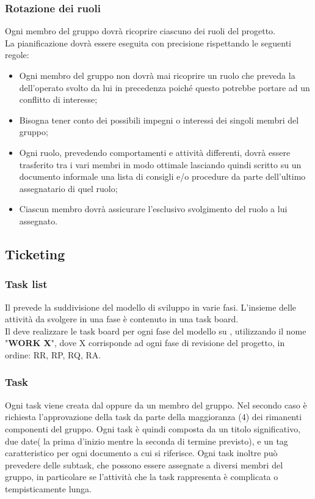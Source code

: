 \documentclass[NormeDiProgetto.tex]{subfiles}
\begin{document}
	\subsubsection{Rotazione dei ruoli}
	Ogni membro del gruppo dovrà ricoprire ciascuno dei ruoli del progetto.\\
	La pianificazione dovrà essere eseguita con precisione rispettando le seguenti regole:
	\begin{itemize}
		\item Ogni membro del gruppo non dovrà mai ricoprire un ruolo che preveda la  dell'operato svolto da lui in precedenza poiché questo potrebbe	portare ad un conflitto di interesse;
		\item Bisogna tener conto dei possibili impegni o interessi dei singoli membri del gruppo;
		\item Ogni ruolo, prevedendo comportamenti e attività differenti, dovrà essere trasferito tra i vari membri in modo ottimale lasciando quindi scritto su un documento informale una lista di consigli e/o procedure da parte dell'ultimo assegnatario di quel ruolo;
		\item Ciascun membro dovrà assicurare l'esclusivo svolgimento del ruolo a lui assegnato.
	\end{itemize}
	
	
	\subsection{Ticketing}
	\subsubsection{Task list}
	Il \pdp prevede la suddivisione del modello di sviluppo in varie fasi.
	L'insieme delle attività da svolgere in una fase è contenuto in una task board.\\
	Il \respdiprog deve realizzare le task board per ogni fase del modello su , utilizzando il nome "\textbf{WORK X}", dove X corrisponde ad ogni fase di revisione del progetto, in ordine: RR, RP, RQ, RA.
	
	\subsubsection{Task}
	Ogni task viene creata dal \respdiprog oppure da un membro del gruppo. Nel secondo caso è richiesta l'approvazione della task da parte della maggioranza (4) dei rimanenti componenti del gruppo.
	Ogni task è quindi composta da un titolo significativo, due date( la prima d'inizio mentre la seconda di termine previsto), e un tag caratteristico per ogni documento a cui si riferisce. Ogni task inoltre può prevedere delle subtask, che possono essere assegnate a diversi membri del gruppo, in particolare se l'attività che la task rappresenta è complicata o tempisticamente lunga.
	
\end{document}
